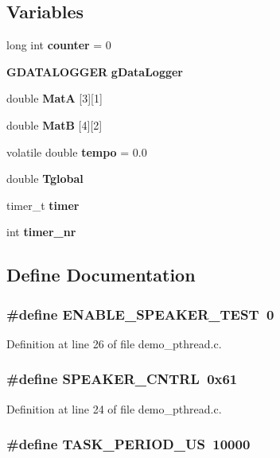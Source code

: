 \subsection*{Variables}
\begin{DoxyCompactItemize}
\item 
long int {\bf counter} = 0
\item 
{\bf GDATALOGGER} {\bf gDataLogger}
\item 
double {\bf MatA} [3][1]
\item 
double {\bf MatB} [4][2]
\item 
volatile double {\bf tempo} = 0.0
\item 
double {\bf Tglobal}
\item 
timer\_\-t {\bf timer}
\item 
int {\bf timer\_\-nr}
\end{DoxyCompactItemize}


\subsection{Define Documentation}
\subsubsection[{ENABLE\_\-SPEAKER\_\-TEST}]{\setlength{\rightskip}{0pt plus 5cm}\#define ENABLE\_\-SPEAKER\_\-TEST~0}\label{demo__pthread_8c_a8c5d779c37c5f2f379069b4ef479edc2}


Definition at line 26 of file demo\_\-pthread.c.
\subsubsection[{SPEAKER\_\-CNTRL}]{\setlength{\rightskip}{0pt plus 5cm}\#define SPEAKER\_\-CNTRL~0x61}\label{demo__pthread_8c_a23052f1fcc2787845f86691870d19e7d}


Definition at line 24 of file demo\_\-pthread.c.
\subsubsection[{TASK\_\-PERIOD\_\-US}]{\setlength{\rightskip}{0pt plus 5cm}\#define TASK\_\-PERIOD\_\-US~10000}\label{demo__pthread_8c_a90ea65b0bef46daf21cc93c6c0c45760}


